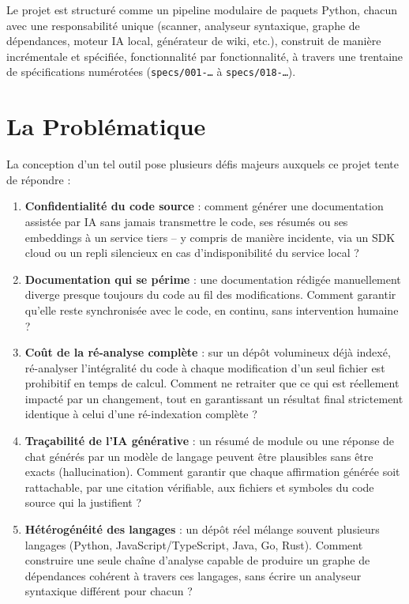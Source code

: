 \documentclass[12pt,a4paper]{report}
\begin{document}
Le projet est structuré comme un pipeline modulaire de paquets Python, chacun avec
une responsabilité unique (scanner, analyseur syntaxique, graphe de dépendances,
moteur IA local, générateur de wiki, etc.), construit de manière incrémentale et
spécifiée, fonctionnalité par fonctionnalité, à travers une trentaine de
spécifications numérotées (\texttt{specs/001-\dots} à \texttt{specs/018-\dots}).

\section{La Problématique}
La conception d'un tel outil pose plusieurs défis majeurs auxquels ce projet tente de
répondre :
\begin{enumerate}
    \item \textbf{Confidentialité du code source} : comment générer une documentation
    assistée par IA sans jamais transmettre le code, ses résumés ou ses embeddings à
    un service tiers -- y compris de manière incidente, via un SDK cloud ou un
    repli silencieux en cas d'indisponibilité du service local ?
    \item \textbf{Documentation qui se périme} : une documentation rédigée
    manuellement diverge presque toujours du code au fil des modifications. Comment
    garantir qu'elle reste synchronisée avec le code, en continu, sans intervention
    humaine ?
    \item \textbf{Coût de la ré-analyse complète} : sur un dépôt volumineux déjà
    indexé, ré-analyser l'intégralité du code à chaque modification d'un seul fichier
    est prohibitif en temps de calcul. Comment ne retraiter que ce qui est réellement
    impacté par un changement, tout en garantissant un résultat final strictement
    identique à celui d'une ré-indexation complète ?
    \item \textbf{Traçabilité de l'IA générative} : un résumé de module ou une réponse
    de chat générés par un modèle de langage peuvent être plausibles sans être exacts
    (hallucination). Comment garantir que chaque affirmation générée soit
    rattachable, par une citation vérifiable, aux fichiers et symboles du code source
    qui la justifient ?
    \item \textbf{Hétérogénéité des langages} : un dépôt réel mélange souvent
    plusieurs langages (Python, JavaScript/TypeScript, Java, Go, Rust). Comment
    construire une seule chaîne d'analyse capable de produire un graphe de
    dépendances cohérent à travers ces langages, sans écrire un analyseur syntaxique
    différent pour chacun ?
\end{enumerate}
\end{document}
